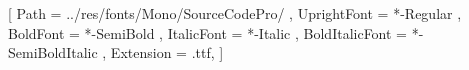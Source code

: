 \setmonofont{SourceCodePro}
[
	Path = ../res/fonts/Mono/SourceCodePro/ ,
	UprightFont = *-Regular ,
	BoldFont = *-SemiBold ,
	ItalicFont = *-Italic ,
	BoldItalicFont = *-SemiBoldItalic ,
	Extension = .ttf,
]